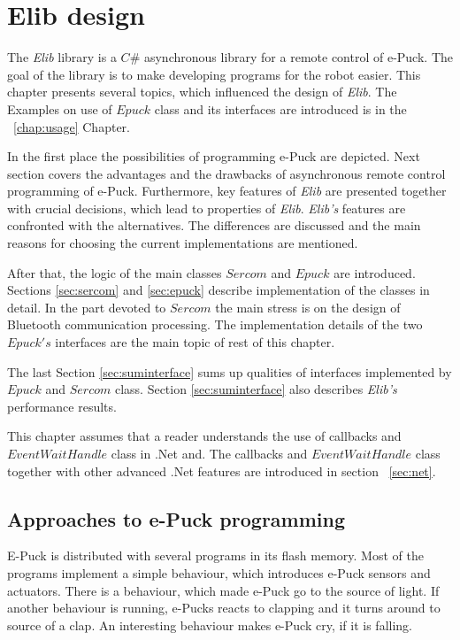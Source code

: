 \chapter{Elib design} \label{chap:elib}
  The {\it Elib} library is a $C\#$ asynchronous library for a remote control of e-Puck. 
  The goal of the library is to make developing programs for the robot easier.
  This chapter presents several topics, which influenced the design of {\it Elib}.
  The Examples on use of $Epuck$ class and its interfaces are introduced is in the ~\ref{chap:usage} Chapter.

  In the first place the possibilities of programming e-Puck are depicted.
  Next section covers the advantages and the drawbacks of asynchronous remote control programming of e-Puck.
  Furthermore, key features of {\it Elib} are presented together with crucial decisions, which
  lead to properties of {\it Elib}. 
  {\it Elib's} features are confronted with the alternatives. The differences are discussed
  and the main reasons for choosing the current implementations are mentioned.

  After that, the logic of the main classes $Sercom$ and $Epuck$ are introduced. Sections 
  \ref{sec:sercom} and \ref{sec:epuck} describe implementation of the classes in detail. 
  In the part devoted to $Sercom$ the main stress is on the design of Bluetooth communication processing.
  The implementation details of the two $Epuck's$ interfaces are the main topic of rest of this chapter. 

  The last Section \ref{sec:suminterface} sums up qualities of interfaces 
  implemented by $Epuck$ and $Sercom$ class.
  Section \ref{sec:suminterface} also describes {\it Elib's} performance results.

  This chapter assumes that a reader understands the use of callbacks and $EventWaitHandle$ class in .Net and.
  The callbacks and $EventWaitHandle$ class together with other advanced .Net features 
  are introduced in section ~\ref{sec:net}.

\section{Approaches to e-Puck programming} \label{sec:approach}
  E-Puck is distributed with several programs in its flash memory. 
  Most of the programs implement a simple behaviour, which introduces e-Puck sensors and actuators.
  There is a behaviour, which made e-Puck go to the source of light.
  If another behaviour is running, e-Pucks
  reacts to clapping and it turns around to source of a clap. An interesting behaviour makes
  e-Puck cry, if it is falling.
   
